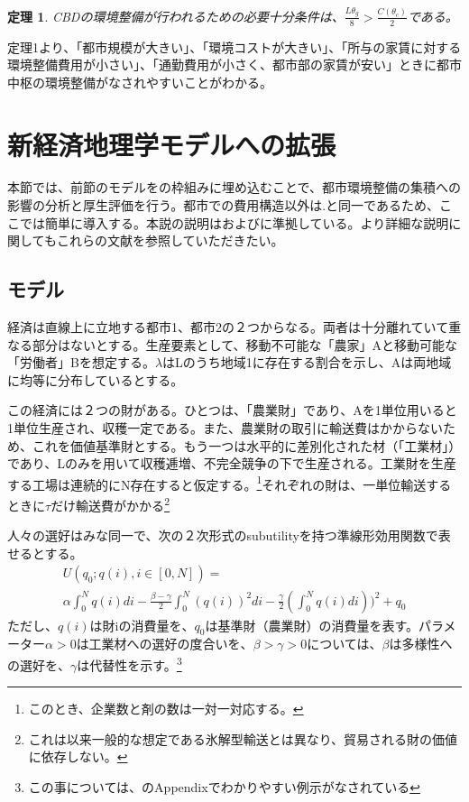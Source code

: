 \documentclass[a4paper]{jarticle}
\newtheorem{teiri}{定理}
\begin{document}
\begin{teiri}
CBDの環境整備が行われるための必要十分条件は、$\frac{L\theta_g}{8} >\frac{C(\theta_c)}{2}$である。
\end{teiri}

定理1より、「都市規模が大きい」、「環境コストが大きい」、「所与の家賃に対する環境整備費用が小さい」、「通勤費用が小さく、都市部の家賃が安い」ときに都市中枢の環境整備がなされやすいことがわかる。

\section{新経済地理学モデルへの拡張}
本節では、前節のモデルを\citet{ottaviano02:aggl}の枠組みに埋め込むことで、都市環境整備の集積への影響の分析と厚生評価を行う。都市での費用構造以外は\citet{ottaviano02:aggl}.と同一であるため、ここでは簡単に導入する。本説の説明は\citet{ottaviano02:aggl}および\citet{combes08:econ}に準拠している。より詳細な説明に関してもこれらの文献を参照していただきたい。

\subsection{モデル}
経済は直線上に立地する都市1、都市2の２つからなる。両者は十分離れていて重なる部分はないとする。生産要素として、移動不可能な「農家」Aと移動可能な「労働者」Bを想定する。$\lambda$はLのうち地域1に存在する割合を示し、Aは両地域に均等に分布しているとする。

この経済には２つの財がある。ひとつは、「農業財」であり、Aを1単位用いると1単位生産され、収穫一定である。また、農業財の取引に輸送費はかからないため、これを価値基準財とする。もう一つは水平的に差別化された材（「工業材」）であり、Lのみを用いて収穫逓増、不完全競争の下で生産される。工業財を生産する工場は連続的にN存在すると仮定する。\footnote{このとき、企業数と剤の数は一対一対応する。}それぞれの財は、一単位輸送するときに$\tau$だけ輸送費がかかる\footnote{これは\citet{krugman91:incr}以来一般的な想定である氷解型輸送とは異なり、貿易される財の価値に依存しない。}

人々の選好はみな同一で、次の２次形式のsubutilityを持つ準線形効用関数で表せるとする。
\begin{multline}
U(q_0; q(i), i \in[0, N]) = \\
\alpha \int_{0}^{N}q(i) di - \frac{\beta - \gamma}{2}\int_{0}^{N} (q(i))^2 di - \frac{\gamma}{2}(\int_{0}^{N}q(i)di))^2 + q_0
\end{multline}
ただし、$q(i)$は財iの消費量を、$q_0$は基準財（農業財）の消費量を表す。パラメーター$\alpha>0$は工業材への選好の度合いを、$\beta > \gamma > 0$については、$\beta$は多様性への選好を、$\gamma$は代替性を示す。\footnote{この事については、\citet{ottaviano02:aggl}のAppendixでわかりやすい例示がなされている}
\end{document}
